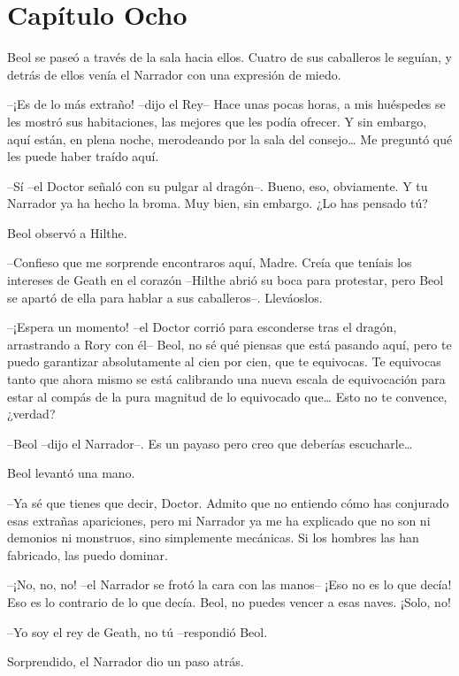 \chapter*{Capítulo Ocho}

{Beol se paseó a través de la sala hacia ellos. Cuatro de sus caballeros
	le seguían, y detrás de ellos venía el Narrador con una expresión de
miedo.}

{--¡Es de lo más extraño! --dijo el Rey-- Hace unas pocas horas, a mis
	huéspedes se les mostró sus habitaciones, las mejores que les podía
	ofrecer. Y sin embargo, aquí están, en plena noche, merodeando por la
	sala del consejo\ldots{} Me preguntó qué les puede haber traído aquí.}

{--Sí --el Doctor señaló con su pulgar al dragón--. Bueno, eso,
	obviamente. Y tu Narrador ya ha hecho la broma. Muy bien, sin embargo.
¿Lo has pensado tú?}

{Beol observó a Hilthe.}

{--Confieso que me sorprende encontraros aquí, Madre. Creía que
	teníais los intereses de Geath en el corazón --Hilthe abrió su boca para
	protestar, pero Beol se apartó de ella para hablar a sus caballeros--.
Lleváoslos.}

{--¡Espera un momento! --el Doctor corrió para esconderse tras el
	dragón, arrastrando a Rory con él-- Beol, no sé qué piensas que está
	pasando aquí, pero te puedo garantizar absolutamente al cien por cien,
	que te equivocas. Te equivocas tanto que ahora mismo se está calibrando
	una nueva escala de equivocación para estar al compás de la pura
	magnitud de lo equivocado que\ldots{} Esto no te convence, ¿verdad?}

{--Beol --dijo el Narrador--. Es un payaso pero creo que deberías
	escucharle\ldots{}}

{Beol levantó una mano.}

{--Ya sé que tienes que decir, Doctor. Admito que no entiendo cómo has
	conjurado esas extrañas apariciones, pero mi Narrador ya me ha explicado
	que no son ni demonios ni monstruos, sino simplemente mecánicas. Si los
hombres las han fabricado, las puedo dominar.}

{--¡No, no, no! --el Narrador se frotó la cara con las manos-- ¡Eso no
	es lo que decía! Eso es lo contrario de lo que decía. Beol, no puedes
vencer a esas naves. ¡Solo, no!}

{--Yo soy el rey de Geath, no tú --respondió Beol.}

{Sorprendido, el Narrador dio un paso atrás.}

